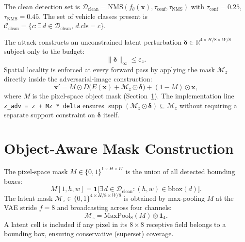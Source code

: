 \documentclass[12pt,a4paper]{report}
\begin{document}
The clean detection set is $\mathcal{D}_{\text{clean}} = \mathrm{NMS}(f_\theta(\mathbf{x}),
\tau_{\text{conf}}, \tau_{\text{NMS}})$ with $\tau_{\text{conf}} = 0.25$, $\tau_{\text{NMS}} = 0.45$.
The set of vehicle classes present is $\mathcal{C}_{\text{clean}} = \{ c : \exists\, d \in \mathcal{D}_{\text{clean}},\, d.\text{cls} = c \}$.

The attack constructs an unconstrained latent perturbation
$\bm{\delta} \in \mathbb{R}^{4 \times H/8 \times W/8}$ subject only to the budget:
\begin{equation}
  \|\bm{\delta}\|_\infty \leq \varepsilon_z. \label{eq:linf}
\end{equation}
Spatial locality is enforced at every forward pass by applying the mask
$\mathcal{M}_z$ directly inside the adversarial-image construction:
\begin{equation}
  \mathbf{x}' = M \odot D\!\bigl(E(\mathbf{x}) + \mathcal{M}_z \odot \bm{\delta}\bigr)
    + (1 - M) \odot \mathbf{x},
  \label{eq:xadv_full}
\end{equation}
where $M$ is the pixel-space object mask (Section~\ref{sec:masks}). The
implementation line \texttt{z\_adv = z + Mz * delta} ensures
$\operatorname{supp}(\mathcal{M}_z \odot \bm{\delta}) \subseteq \mathcal{M}_z$
without requiring a separate support constraint on $\bm{\delta}$ itself.

\section{Object-Aware Mask Construction}
\label{sec:masks}



The pixel-space mask $M \in \{0,1\}^{1 \times H \times W}$ is the union of all detected bounding boxes:
\begin{equation}
  M[1, h, w] = \mathbf{1}\bigl[\exists\, d \in \mathcal{D}_{\text{clean}} :
    (h, w) \in \mathrm{bbox}(d)\bigr].
\end{equation}
The latent mask $\mathcal{M}_z \in \{0,1\}^{4 \times H/8 \times W/8}$ is obtained by max-pooling
$M$ at the VAE stride $f = 8$ and broadcasting across four channels:
\begin{equation}
  \mathcal{M}_z = \mathrm{MaxPool}_8(M) \otimes \mathbf{1}_4.
\end{equation}
A latent cell is included if any pixel in its $8 \times 8$ receptive field belongs to a bounding box,
ensuring conservative (superset) coverage.
\end{document}
